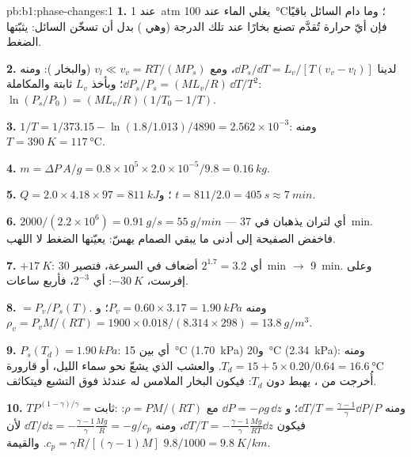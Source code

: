 \begin{solution}{pb:b1:phase-changes:1}
\textbf{1.} عند \qty{1}{atm} يغلي الماء عند \qty{100}{\degreeCelsius}؛ وما دام
السائل باقيًا فإن أيّ حرارة تُقدَّم تصنع بخارًا عند تلك الدرجة
(وهي ) بدل أن تسخّن السائل:  يثبّتها
الضغط.

\textbf{2.} لدينا $\dd P_s/\dd T = L_v/[T(v_v - v_l)]$، ومع
$v_l \ll v_v = RT/(MP_s)$
(والبخار ): ومنه $\dd P_s/P_s = (ML_v/R)\,\dd T/T^2$؛ وبأخذ $L_v$
ثابتة والمكاملة: $\ln(P_s/P_0) = (ML_v/R)(1/T_0 - 1/T)$.

\textbf{3.} $1/T = 1/373.15 - \ln(1.8/1.013)/4890 = 2.562 \times 10^{-3}$: ومنه $T =
\qty{390}{K} = \qty{117}{\degreeCelsius}$.

\textbf{4.} $m = \Delta P\,A/g = 0.8 \times 10^5 \times 2.0 \times 10^{-5}/9.8 =
\qty{0.16}{kg}$.

\textbf{5.} $Q = 2.0 \times 4.18 \times 97 = \qty{811}{kJ}$؛ و $t = 811/2.0 =
\qty{405}{s} \approx \qty{7}{min}$.

\textbf{6.} $2000/(2.2 \times 10^6) = \qty{0.91}{g/s} = \qty{55}{g/min}$ --- أي
لتران يذهبان في \qty{37}{min}. فاخفض الصفيحة إلى أدنى ما يبقي
الصمام يهسّ:  يعيّنها الضغط لا
اللهب.

\textbf{7.} $+\qty{17}{K}$: أي $2^{1.7} = 3.2$ أضعاف في السرعة، فتصير \qty{30}{min}
$\to$ \qty{9}{min}. وعلى إفرست، $-\qty{30}{K}$: أي $2^{-3}$، فأربع ساعات.

\textbf{8.}  $= P_v/P_s(T)$. ومنه $P_v = 0.60 \times 3.17 =
\qty{1.90}{kPa}$؛ و $\rho_v = P_vM/(RT) = 1900 \times 0.018/(8.314 \times 298) =
\qty{13.8}{g/m^3}$.

\textbf{9.} $P_s(T_d) = \qty{1.90}{kPa}$: أي بين \qty{15}{\degreeCelsius}
(\qty{1.70}{kPa}) و\qty{20}{\degreeCelsius} (\qty{2.34}{kPa}): ومنه $T_d = 15 + 5 \times 0.20/0.64
= \qty{16.6}{\degreeCelsius}$. والعشب الذي يشعّ نحو سماء الليل، أو
قارورة أُخرجت من ، يهبط دون $T_d$: فيكون البخار الملامس
له عندئذ فوق التشبع فيتكاثف.

\textbf{10.} $TP^{(1-\gamma)/\gamma} = \text{ثابت}$: ومنه $\dd T/T = \frac{\gamma - 1}{\gamma}
\dd P/P$؛ و $\dd P = -\rho g\,\dd z$ مع $\rho = PM/(RT)$: فيكون $\dd T/T = -\frac{\gamma -
1}{\gamma}\frac{Mg}{RT}\dd z$، ومنه $\dd T/\dd z = -\frac{\gamma - 1}{\gamma}\frac{Mg}{R} =
-g/c_p$ لأن $c_p = \gamma R/[(\gamma - 1)M]$. والقيمة $9.8/1000 = \qty{9.8}{K/km}$.


\end{solution}
